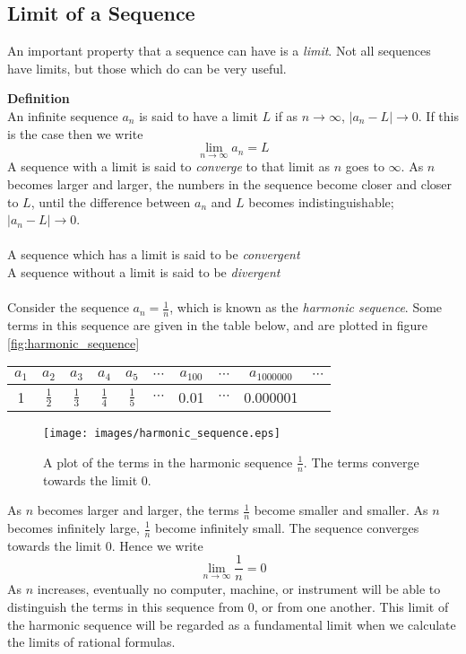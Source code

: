 
\subsection*{Limit of a Sequence}
An important property that a sequence can have is a \emph{limit}. Not all sequences have limits, but those which do can be very useful.

\textbf{Definition}\\
An infinite sequence $a_n$ is said to have a limit $L$ if as $n \to \infty$, $|a_n - L|\to 0$. If this is the case then we write
\begin{equation*}
  \lim_{n\to \infty} a_n = L
\end{equation*}
A sequence with a limit is said to \emph{converge} to that limit as $n$ goes to $\infty$. As $n$ becomes larger and larger, the numbers in the sequence become closer and closer to $L$, until the difference between $a_n$ and $L$ becomes indistinguishable; $|a_n-L|\to 0$.\\
\\
A sequence which has a limit is said to be \emph{convergent}\\
A sequence without a limit is said to be \emph{divergent}\\

\\
Consider the sequence $a_n=\frac{1}{n}$, which is known as the \emph{harmonic sequence}. Some terms in this sequence are given in the table below, and are plotted in figure \vref{fig:harmonic_sequence}
\begin{center}
\begin{tabular}{|c|c|c|c|c|c|c|c|c|c|}
\hline
 $a_1$ & $a_2$ & $a_3$ & $a_4$ & $a_5$ & $\cdots$ & $a_{100}$ & $\cdots$ & $a_{1000000}$ & $\cdots$  \\
\hline
1 & $\frac{1}{2}$ & $\frac{1}{3}$ & $\frac{1}{4}$ & $\frac{1}{5}$  & $\cdots$ & 0.01 & $\cdots $  & 0.000001 &  \\
\hline
\end{tabular}
\end{center}
\begin{figure}
  \centering
  \texttt{[image: images/harmonic\_sequence.eps]}
  \caption{A plot of the terms in the harmonic sequence $\frac{1}{n}$. The terms converge towards the limit $0$. }
  \label{fig:harmonic_sequence}
\end{figure}
As $n$ becomes larger and larger, the terms $\frac{1}{n}$ become smaller and smaller. As $n$ becomes infinitely large, $\frac{1}{n}$ become infinitely small. The sequence converges towards the limit $0$. Hence we write
\begin{equation}
  \label{eq:1}
  \lim_{n \to \infty} \frac{1}{n}  = 0
\end{equation}
As $n$ increases, eventually no computer, machine, or instrument will be able to distinguish the terms in this sequence from $0$, or from one another. This limit of the harmonic sequence will be regarded as a fundamental limit when we calculate the limits of rational formulas.

